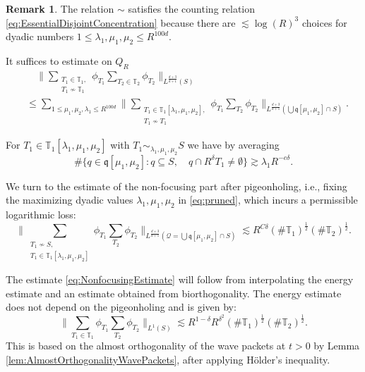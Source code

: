 \documentclass{amsart}
\theoremstyle{definition}
\newtheorem{remark}[theorem]{Remark}
\newcommand{\T}{\mathbb{T}}
\begin{document}
\begin{remark} 
The relation $\sim$ satisfies the counting relation \eqref{eq:EssentialDisjointConcentration} because there are $\lesssim \log(R)^3$ choices for dyadic numbers $1 \leq \lambda_1,\mu_1,\mu_2 \leq R^{100d}$.
\end{remark}

\smallskip

It suffices to estimate on $Q_R$ 
\begin{equation}
\label{eq:pruned}
\begin{split}
   &\quad \big\| \sum_{\substack{ T_1 \in \T_1, \\ T_1 \not\sim \T_1} } \phi_{T_1} \sum_{T_2 \in \T_2} \phi_{T_2} \big\|_{L^{\frac{d+3}{d+1}}(S)} \\
   &\leq \sum_{1 \leq \mu_1, \mu_2, \lambda_1 \leq R^{100d}} \big\| \sum_{ \substack{T_1 \in \T_1[\lambda_1,\mu_1,\mu_2], \\ T_1 \not\sim T_1}} \phi_{T_1} \sum_{T_2} \phi_{T_2} \big\|_{L^{\frac{d+3}{d+1}}(\bigcup \mathfrak{q}[\mu_1,\mu_2] \cap S )}.
\end{split}
\end{equation}

For $T_1 \in \T_1[\lambda_1,\mu_1,\mu_2]$ with $T_1 \sim_{\lambda_1,\mu_1,\mu_2} S$
we have by averaging
\begin{equation}
\label{eq:AveragingEstimate}
\# \{ q \in \mathfrak{q}[\mu_1,\mu_2] : q \subseteq S, \quad q \cap R^\delta T_1 \neq \emptyset \} \gtrsim \lambda_1 R^{-c \delta}.
\end{equation}

We turn to the estimate of the non-focusing part after pigeonholing, i.e., fixing the maximizing dyadic values $\lambda_1, \mu_1, \mu_2$ in \eqref{eq:pruned}, which incurs a permissible logarithmic loss:
\begin{equation}
\label{eq:NonfocusingEstimate}
\big\| \sum_{\substack{T_1 \not\sim S, \\ T_1 \in \T_1[\lambda_1,\mu_1,\mu_2]}} \phi_{T_1} \sum_{T_2} \phi_{T_2} \big\|_{L^{\frac{d+3}{d+1}}(\mathcal{Q} = \bigcup \mathfrak{q}[\mu_1,\mu_2] \cap S)} \lesssim R^{C \delta} (\# \T_1)^{\frac{1}{2}} (\# \T_2)^{\frac{1}{2}}.
\end{equation}

The estimate \eqref{eq:NonfocusingEstimate} will follow from interpolating the energy estimate and an estimate obtained from biorthogonality. The energy estimate does not depend on the pigeonholing and is given by:
\begin{equation}
\label{eq:EnergyEstimate}
\big\| \sum_{T_1 \in \T_1} \phi_{T_1} \sum_{T_2} \phi_{T_2} \big\|_{L^1(S)} \lesssim R^{1-\delta} R^{\delta^2} (\# \T_1)^{\frac{1}{2}} (\# \T_2)^{\frac{1}{2}}.
\end{equation}
This is based on the almost orthogonality of the wave packets at $t > 0$ by Lemma \ref{lem:AlmostOrthogonalityWavePackets}, after applying H\"older's inequality.
\end{document}
